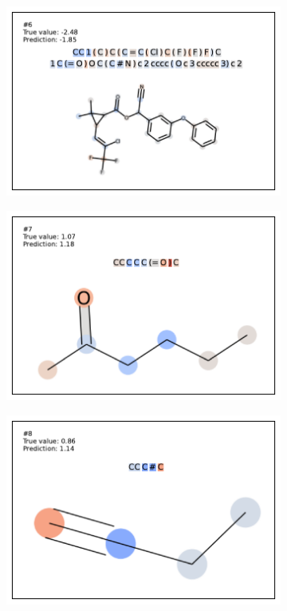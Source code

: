 \begin{figure}
\begin{subfigure}[b]{0.33\textwidth}
\end{subfigure}
\begin{subfigure}[b]{0.33\textwidth} 
  \centering 
  \includegraphics[width=\textwidth]{figures/esol/esol6.pdf} 
\end{subfigure}\begin{subfigure}[b]{0.33\textwidth} 
  \centering 
  \includegraphics[width=\textwidth]{figures/esol/esol7.pdf} 
\end{subfigure}\begin{subfigure}[b]{0.33\textwidth} 
  \centering 
  \includegraphics[width=\textwidth]{figures/esol/esol8.pdf} 

\end{subfigure}
\end{figure}
